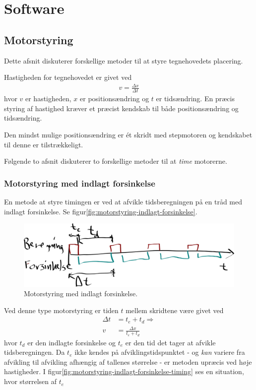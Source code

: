 \chapter{Software}



\section{Motorstyring}


Dette afsnit diskuterer forskellige metoder til at styre tegnehovedets
placering.

Hastigheden for tegnehovedet er givet ved
\begin{align}
  v = \frac{\Delta x}{\Delta t}
\end{align}
hvor $v$ er hastigheden, $x$ er positionsændring og $t$ er
tidsændring. En præcis styring af hastighed kræver et præcist kendskab
til både positionsændring og tidsændring.

Den mindst mulige positionsændring er ét skridt med
stepmotoren og kendskabet til denne er
tilstrækkeligt.

Følgende to afsnit diskuterer to forskellige metoder til at
\textit{time} motorerne.


\subsection{Motorstyring med indlagt forsinkelse}

En metode at styre timingen er ved at afvikle tidsberegningen på en
tråd med indlagt forsinkelse. Se
figur\vref{fig:motorstyring-indlagt-forsinkelse}.

\begin{figure}[htbp]
  \centering
  \includegraphics[width=.7\textwidth]{../brugere/kjaergaard/motorstyring-indlagt-forsinkelse}
  \caption{Motorstyring med indlagt forsinkelse.}
  \label{fig:motorstyring-indlagt-forsinkelse}
\end{figure}

Ved denne type motorstyring er tiden $t$ mellem
skridtene være givet ved
\begin{align}
  \Delta t &= t_e + t_d \nonumber \Rightarrow \\
  v &= \frac{\Delta x}{t_e + t_d}
\end{align}
hvor $t_d$ er den indlagte forsinkelse og $t_e$ er den tid det tager
at afvikle tidsberegningen. Da $t_e$ ikke kendes på
afviklingstidspunktet - og \textit{kan} variere fra afvikling til
afvikling afhængig af tallenes størrelse - er metoden upræcis ved høje
hastigheder. I figur\vref{fig:motorstyring-indlagt-forsinkelse-timing}
ses en situation, hvor størrelsen af $t_e$

